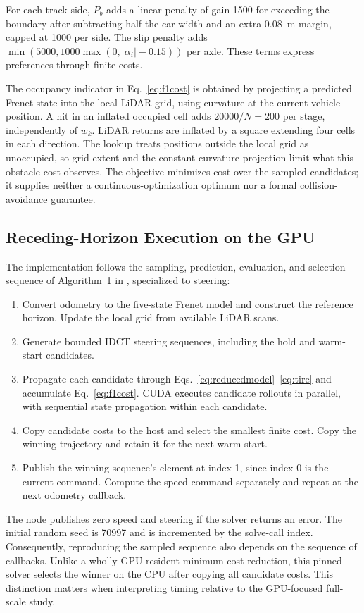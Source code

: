 For each track side, $P_b$ adds a linear penalty of gain 1500 for exceeding the boundary after subtracting half the car width and an extra 0.08~m margin, capped at 1000 per side. The slip penalty adds $\min(5000,1000\max(0,|\alpha_i|-0.15))$ per axle. These terms express preferences through finite costs.

The occupancy indicator in Eq.~\ref{eq:f1cost} is obtained by projecting a predicted Frenet state into the local LiDAR grid, using curvature at the current vehicle position. A hit in an inflated occupied cell adds $20000/N=200$ per stage, independently of $w_k$. LiDAR returns are inflated by a square extending four cells in each direction. The lookup treats positions outside the local grid as unoccupied, so grid extent and the constant-curvature projection limit what this obstacle cost observes. The objective minimizes cost over the sampled candidates; it supplies neither a continuous-optimization optimum nor a formal collision-avoidance guarantee.

\subsection{Receding-Horizon Execution on the GPU}
The implementation follows the sampling, prediction, evaluation, and selection sequence of Algorithm~1 in \cite{muraleedharan2025racing}, specialized to steering:
\begin{enumerate}
\item Convert odometry to the five-state Frenet model and construct the reference horizon. Update the local grid from available LiDAR scans.
\item Generate bounded IDCT steering sequences, including the hold and warm-start candidates.
\item Propagate each candidate through Eqs.~\ref{eq:reducedmodel}--\ref{eq:tire} and accumulate Eq.~\ref{eq:f1cost}. CUDA executes candidate rollouts in parallel, with sequential state propagation within each candidate.
\item Copy candidate costs to the host and select the smallest finite cost. Copy the winning trajectory and retain it for the next warm start.
\item Publish the winning sequence's element at index 1, since index 0 is the current command. Compute the speed command separately and repeat at the next odometry callback.
\end{enumerate}
The node publishes zero speed and steering if the solver returns an error. The initial random seed is 70997 and is incremented by the solve-call index. Consequently, reproducing the sampled sequence also depends on the sequence of callbacks. Unlike a wholly GPU-resident minimum-cost reduction, this pinned solver selects the winner on the CPU after copying all candidate costs. This distinction matters when interpreting timing relative to the GPU-focused full-scale study.

